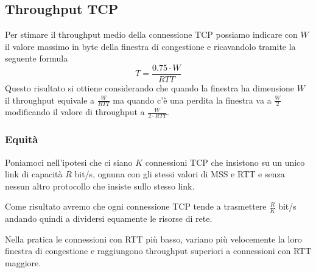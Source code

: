 \subsection{Throughput TCP}
Per stimare il throughput medio della connessione TCP possiamo indicare con $W$ il valore massimo
in byte della finestra di congestione e ricavandolo tramite la seguente formula
\[ T = \frac{0.75 \cdot W}{RTT} \]
Questo risultato si ottiene considerando che quando la finestra ha dimensione $W$ il throughput 
equivale a $\frac{W}{RTT}$ ma quando c'è una perdita la finestra va a $\frac{W}{2}$ modificando il
valore di throughput a $\frac{W}{2 \cdot RTT}$.

\subsubsection{Equità}
Poniamoci nell'ipotesi che ci siano $K$ connessioni TCP che insistono su un unico link di capacità
$R$ bit/s, ognuna con gli stessi valori di MSS e RTT e senza nessun altro protocollo che insiste
sullo stesso link.

Come risultato avremo che ogni connessione TCP tende a trasmettere $\frac{R}{K}$ bit/s andando
quindi a dividersi equamente le risorse di rete.

Nella pratica le connessioni con RTT più basso, variano più velocemente la loro finestra di
congestione e raggiungono throughput superiori a connessioni con RTT maggiore.
